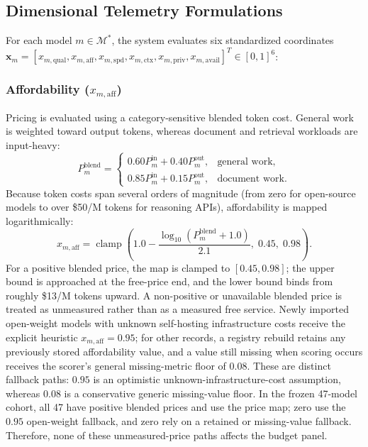 \documentclass[pdflatex,sn-mathphys-num]{sn-jnl}
\theoremstyle{thmstyleone}
\theoremstyle{thmstylethree}
\begin{document}
\subsection{Dimensional Telemetry Formulations}\label{subsec:dimensions}

For each model $m \in \mathcal{M}^*$, the system evaluates six standardized coordinates $\mathbf{x}_m = [x_{m, \text{qual}}, x_{m, \text{aff}}, x_{m, \text{spd}}, x_{m, \text{ctx}}, x_{m, \text{priv}}, x_{m, \text{avail}}]^T \in [0, 1]^6$:

\subsubsection{Affordability ($x_{m, \text{aff}}$)}
Pricing is evaluated using a category-sensitive blended token cost. General work is weighted toward output tokens, whereas document and retrieval workloads are input-heavy:
\begin{equation}\label{eq:price_blend}
P_m^{\text{blend}} = \begin{cases}
0.60 P_m^{\text{in}} + 0.40 P_m^{\text{out}}, & \text{general work}, \\[4pt]
0.85 P_m^{\text{in}} + 0.15 P_m^{\text{out}}, & \text{document work}.
\end{cases}
\end{equation}
Because token costs span several orders of magnitude (from zero for open-source models to over \$50/M tokens for reasoning APIs), affordability is mapped logarithmically:
\begin{equation}\label{eq:price_map}
x_{m, \text{aff}} = \operatorname{clamp}\left( 1.0 - \frac{\log_{10}(P_m^{\text{blend}} + 1.0)}{2.1}, \; 0.45, \; 0.98 \right).
\end{equation}
For a positive blended price, the map is clamped to $[0.45,0.98]$; the upper bound is approached at the free-price end, and the lower bound binds from roughly \$13/M tokens upward. A non-positive or unavailable blended price is treated as unmeasured rather than as a measured free service. Newly imported open-weight models with unknown self-hosting infrastructure costs receive the explicit heuristic $x_{m,\text{aff}}=0.95$; for other records, a registry rebuild retains any previously stored affordability value, and a value still missing when scoring occurs receives the scorer's general missing-metric floor of $0.08$. These are distinct fallback paths: $0.95$ is an optimistic unknown-infrastructure-cost assumption, whereas $0.08$ is a conservative generic missing-value floor. In the frozen 47-model cohort, all 47 have positive blended prices and use the price map; zero use the $0.95$ open-weight fallback, and zero rely on a retained or missing-value fallback. Therefore, none of these unmeasured-price paths affects the budget panel.
\end{document}
